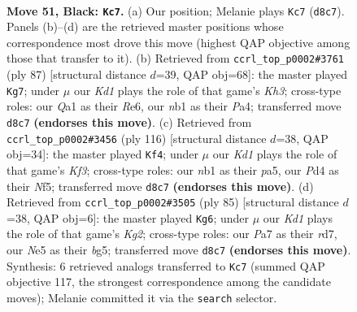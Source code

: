 \documentclass[11pt]{article}
\begin{document}
\clearpage

\begin{figure}[p]\centering
\begin{subfigure}{0.46\textwidth}\centering
\resizebox{\linewidth}{!}{%
\newchessgame
\chessboard[
  setfen={1R1k4/p6p/8/4nr2/1p1p4/8/4P3/qNK5 b - - 1 51},
  showmover=false,
  pgfstyle=straightmove, color=movearrow, markmove={d8-c7}
]}
\caption{}
\end{subfigure}\hfill
\begin{subfigure}{0.46\textwidth}\centering
\resizebox{\linewidth}{!}{%
\newchessgame
\chessboard[
  setfen={7R/1pp5/4r2k/8/p1P4p/5K2/PP2N3/8 b - - 13 44},
  showmover=false,
  pgfstyle=straightmove, color=movearrow, markmove={h6-g7}
]}
\caption{}
\end{subfigure}
\\[4pt]
\begin{subfigure}{0.46\textwidth}\centering
\resizebox{\linewidth}{!}{%
\newchessgame
\chessboard[
  setfen={7k/1q6/5p2/p4Nr1/6P1/2P2K2/8/4Q3 w - - 4 59},
  showmover=false,
  pgfstyle=straightmove, color=movearrow, markmove={f3-f4}
]}
\caption{}
\end{subfigure}\hfill
\begin{subfigure}{0.46\textwidth}\centering
\resizebox{\linewidth}{!}{%
\newchessgame
\chessboard[
  setfen={2R5/3R1pk1/8/4p1Bp/8/5qP1/7K/8 b - - 7 43},
  showmover=false,
  pgfstyle=straightmove, color=movearrow, markmove={g7-g6}
]}
\caption{}
\end{subfigure}
\caption{\textbf{Move 51, Black: \texttt{Kc7}.} (a) Our position; Melanie plays \texttt{Kc7} (\texttt{d8c7}). Panels (b)--(d) are the retrieved master positions whose correspondence most drove this move (highest QAP objective among those that transfer to it). (b) Retrieved from \texttt{ccrl\_top\_p0002\#3761} (ply 87) [structural distance $d$=39, QAP obj=68]: the master played \texttt{Kg7}; under $\mu$ our \emph{Kd1} plays the role of that game's \emph{Kh3}; cross-type roles: our \emph{Q}a1 as their \emph{R}e6, our \emph{n}b1 as their \emph{P}a4; transferred move \texttt{d8c7} \textbf{(endorses this move)}. (c) Retrieved from \texttt{ccrl\_top\_p0002\#3456} (ply 116) [structural distance $d$=38, QAP obj=34]: the master played \texttt{Kf4}; under $\mu$ our \emph{Kd1} plays the role of that game's \emph{Kf3}; cross-type roles: our \emph{n}b1 as their \emph{p}a5, our \emph{P}d4 as their \emph{N}f5; transferred move \texttt{d8c7} \textbf{(endorses this move)}. (d) Retrieved from \texttt{ccrl\_top\_p0002\#3505} (ply 85) [structural distance $d$=38, QAP obj=6]: the master played \texttt{Kg6}; under $\mu$ our \emph{Kd1} plays the role of that game's \emph{Kg2}; cross-type roles: our \emph{P}a7 as their \emph{r}d7, our \emph{N}e5 as their \emph{b}g5; transferred move \texttt{d8c7} \textbf{(endorses this move)}. Synthesis: 6 retrieved analogs transferred to \texttt{Kc7} (summed QAP objective 117, the strongest correspondence among the candidate moves); Melanie committed it via the \texttt{search} selector.}
\label{fig:thought-m101}
\end{figure}
\end{document}
